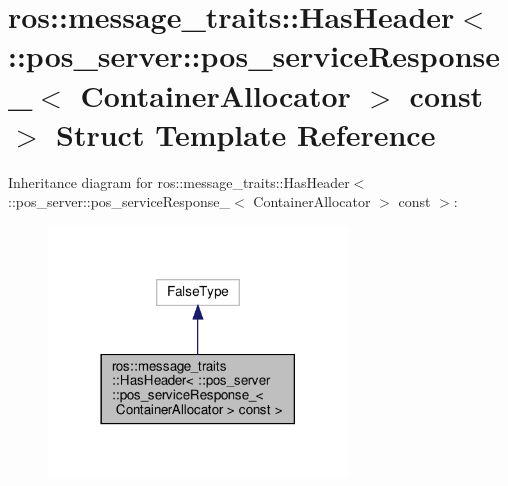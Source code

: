 \hypertarget{structros_1_1message__traits_1_1HasHeader_3_01_1_1pos__server_1_1pos__serviceResponse___3_01Contca807aa011007cf6ebd0e11a4628e097}{}\section{ros\+:\+:message\+\_\+traits\+:\+:Has\+Header$<$ \+:\+:pos\+\_\+server\+:\+:pos\+\_\+service\+Response\+\_\+$<$ Container\+Allocator $>$ const $>$ Struct Template Reference}
\label{structros_1_1message__traits_1_1HasHeader_3_01_1_1pos__server_1_1pos__serviceResponse___3_01Contca807aa011007cf6ebd0e11a4628e097}


Inheritance diagram for ros\+:\+:message\+\_\+traits\+:\+:Has\+Header$<$ \+:\+:pos\+\_\+server\+:\+:pos\+\_\+service\+Response\+\_\+$<$ Container\+Allocator $>$ const $>$\+:
\nopagebreak
\begin{figure}[H]
\begin{center}
\leavevmode
\includegraphics[width=225pt]{structros_1_1message__traits_1_1HasHeader_3_01_1_1pos__server_1_1pos__serviceResponse___3_01Cont4783bf7f5d75afdf3f55a29fbd214d2d}
\end{center}
\end{figure}


